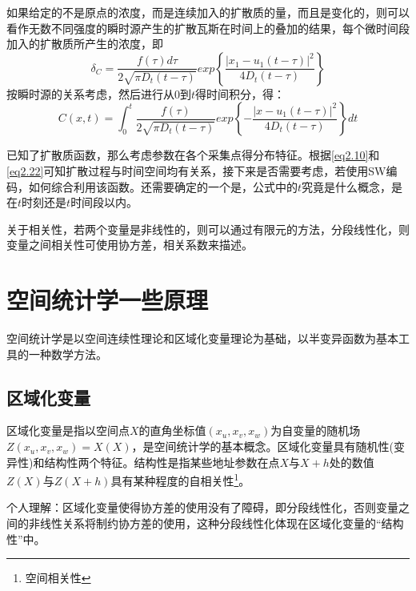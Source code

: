 如果给定的不是原点的浓度，而是连续加入的扩散质的量，而且是变化的，则可以看作无数不同强度的瞬时源产生的扩散瓦斯在时间上的叠加的结果，每个微时间段加入的扩散质所产生的浓度，即
\begin{equation}
    \delta_C = \dfrac{f(\tau)d\tau}{2\sqrt{\pi D_t(t-\tau)}} exp\left\{ \dfrac{\left| x_1 - u_1(t-\tau) \right|^2}{4D_t(t-\tau)} \right\}
    \label{eq-variantconcentration}
\end{equation}
按瞬时源的关系考虑，然后进行从$0$到$t$得时间积分，得：
\begin{equation}
    C(x,t) = \int_{0}^{t}\dfrac{f(\tau)}{2\sqrt{\pi D_t (t-\tau)}}exp\left\{ -\dfrac{\left| x-u_1(t-\tau) \right|^2}{4D_t(t-\tau)} \right\}dt
    \label{eq-concentrationvariant}
\end{equation}

\begin{note}
    已知了扩散质函数，那么考虑参数在各个采集点得分布特征。根据\cref{eq2.10}和\cref{eq2.22}可知扩散过程与时间空间均有关系，接下来是否需要考虑，若使用SW编码，如何综合利用该函数。还需要确定的一个是，公式中的$t$究竟是什么概念，是在$t$时刻还是$t$时间段以内。

    关于相关性，若两个变量是非线性的，则可以通过有限元的方法，分段线性化，则变量之间相关性可使用协方差，相关系数来描述。
\end{note}


\section{空间统计学一些原理}
空间统计学是以空间连续性理论和区域化变量理论为基础，以半变异函数为基本工具的一种数学方法。


\subsection{区域化变量}
区域化变量是指以空间点$X$的直角坐标值$(x_u,x_v,x_w)$为自变量的随机场$Z(x_u,x_v,x_w) = X(X)$，是空间统计学的基本概念。区域化变量具有随机性(变异性)和结构性两个特征。结构性是指某些地址参数在点$X$与$X+h$处的数值$Z(X)$与$Z(X+h)$具有某种程度的自相关性\footnote{空间相关性}。
\begin{note}
    个人理解：区域化变量使得协方差的使用没有了障碍，即分段线性化，否则变量之间的非线性关系将制约协方差的使用，这种分段线性化体现在区域化变量的``结构性''中。
\end{note}





